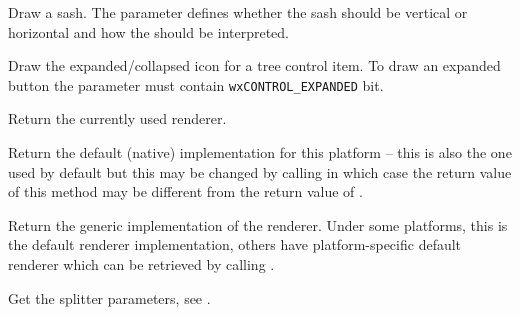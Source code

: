 
Draw a sash. The  parameter defines whether the sash should be
vertical or horizontal and how the  should be interpreted.


\label{wxrenderernativedrawtreeitembutton}


Draw the expanded/collapsed icon for a tree control item. To draw an expanded
button the  parameter must contain {\tt wxCONTROL\_EXPANDED} bit.


\label{wxrenderernativeget}


Return the currently used renderer.


\label{wxrenderernativegetdefault}


Return the default (native) implementation for this platform -- this is also
the one used by default but this may be changed by calling 
 in which case the return value of this
method may be different from the return value of .


\label{wxrenderernativegetgeneric}


Return the generic implementation of the renderer. Under some platforms, this
is the default renderer implementation, others have platform-specific default
renderer which can be retrieved by calling .


\label{wxrenderernativegetsplitterparams}


Get the splitter parameters, see 
.


